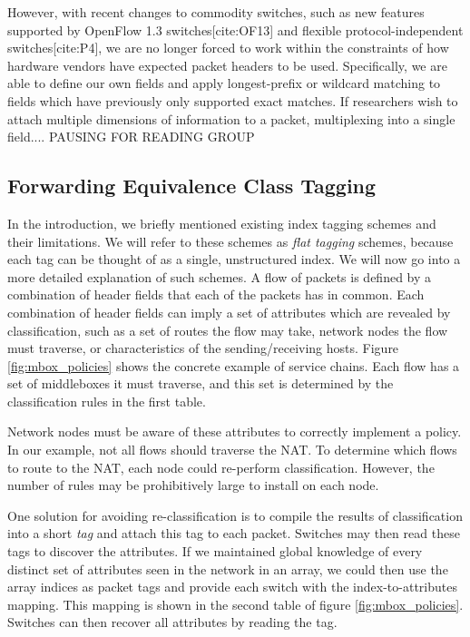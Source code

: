  However, with recent changes to commodity switches, such as new features supported by OpenFlow 1.3 switches[cite:OF13] and flexible protocol-independent switches[cite:P4], we are no longer forced to work within the constraints of how hardware vendors have expected packet headers to be used. Specifically, we are able to define our own fields and apply longest-prefix or wildcard matching to fields which have previously only supported exact matches. If researchers wish to attach multiple dimensions of information to a packet, multiplexing into a single field.... PAUSING FOR READING GROUP

\subsection{Forwarding Equivalence Class Tagging}
  
In the introduction, we briefly mentioned existing index tagging schemes and their limitations. We will refer to these schemes as \textit{flat tagging} schemes, because each tag can be thought of as a single, unstructured index.  We will now go into a more detailed explanation of such schemes. A flow of packets is defined by a combination of header fields that each of the packets has in common. Each combination of header fields can imply a set of attributes which are revealed by classification, such as a set of routes the flow may take, network nodes the flow must traverse, or characteristics of the sending/receiving hosts. Figure \ref{fig:mbox_policies} shows the concrete example of service chains. Each flow has a set of middleboxes it must traverse, and this set is determined by the classification rules in the first table.

Network nodes must be aware of these attributes to correctly implement a policy. In our example, not all flows should traverse the NAT. To determine which flows to route to the NAT, each node could re-perform classification. However, the number of rules may be prohibitively large to install on each node. 

One solution for avoiding re-classification is to compile the results of classification into a short \textit{tag} and attach this tag to each packet. Switches may then read these tags to discover the attributes. If we maintained global knowledge of every distinct set of attributes seen in the network in an array, we could then use the array indices as packet tags and provide each switch with the index-to-attributes mapping. This mapping is shown in the second table of figure \ref{fig:mbox_policies}. Switches can then recover all attributes by reading the tag. 

